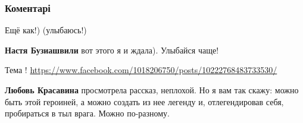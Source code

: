  
 
 
 
 
\subsubsection{Коментарі}

\begin{itemize}
 
Ещё как!) (улыбаюсь!)

\begin{itemize}
 
\textbf{Настя Бузиашвили} вот этого я и ждала). Улыбайся чаще!
\end{itemize}

 
Тема !
\url{https://www.facebook.com/1018206750/posts/10222768483733530/}

\begin{itemize}
 
\textbf{Любовь Красавина} просмотрела рассказ, неплохой. Но я вам так скажу: можно быть этой героиней, а можно создать из нее легенду и, отлегендировав себя, пробираться в тыл врага. Можно по-разному.


\end{itemize}
\end{itemize}
